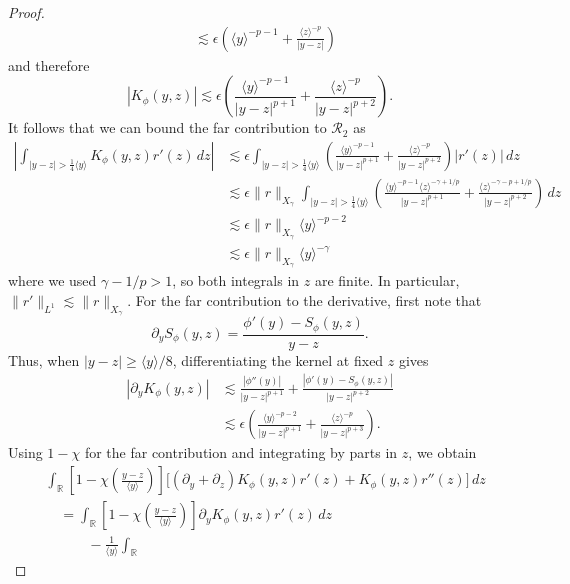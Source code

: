 \documentclass[11pt]{amsart}
\theoremstyle{definition}
\theoremstyle{remark}
\numberwithin{equation}{section}
\newcommand{\R}{\mathbb{R}}
\newcommand{\mc}[1]{\mathcal{#1}}
\newcommand{\ang}[1]{\langle #1 \rangle}
\begin{document}
\begin{proof}
\begin{align*}
    & \lesssim \epsilon\left(\ang{y}^{-p-1} + \frac{\ang{z}^{-p}}{|y - z|}\right)
\end{align*}
and therefore
\[|K_\phi(y, z)| \lesssim \epsilon\left(\frac{\ang{y}^{-p-1}}{|y - z|^{p+1}} + \frac{\ang{z}^{-p}}{|y - z|^{p+2}}\right).\]
It follows that we can bound the far contribution to $\mc{R}_2$ as
\begin{align*}
    \left|\int_{|y - z| > \frac{1}{4}\ang{y}} K_\phi(y, z) r'(z) \, dz\right| & \lesssim \epsilon\int_{|y - z| > \frac{1}{4}\ang{y}}\left(\frac{\ang{y}^{-p-1}}{|y - z|^{p+1}} + \frac{\ang{z}^{-p}}{|y - z|^{p+2}}\right)|r'(z)| \, dz\\
    & \lesssim \epsilon\|r\|_{X_\gamma}\int_{|y - z| > \frac{1}{4}\ang{y}}\left(\frac{\ang{y}^{-p-1}\ang{z}^{-\gamma+1/p}}{|y - z|^{p+1}} + \frac{\ang{z}^{-\gamma-p+1/p}}{|y - z|^{p+2}}\right) \, dz\\
    & \lesssim \epsilon\|r\|_{X_\gamma}\ang{y}^{-p-2} \\
    & \lesssim \epsilon\|r\|_{X_\gamma}\ang{y}^{-\gamma}
\end{align*}
where we used $\gamma-1/p>1$, so both integrals in $z$ are finite. In particular, $\|r'\|_{L^1}\lesssim\|r\|_{X_\gamma}$. For the far contribution to the derivative, first note that
\[
    \partial_yS_\phi(y,z)=\frac{\phi'(y)-S_\phi(y,z)}{y-z}.
\]
Thus, when $|y-z|\geq\ang{y}/8$, differentiating the kernel at fixed $z$ gives
\begin{equation}\label{eqn:linear_R2_far_kernel_derivative}
\begin{aligned}
    |\partial_yK_\phi(y,z)|
    &\lesssim\frac{|\phi''(y)|}{|y-z|^{p+1}}
    +\frac{|\phi'(y)-S_\phi(y,z)|}{|y-z|^{p+2}}\\
    &\lesssim\epsilon\left(
    \frac{\ang{y}^{-p-2}}{|y-z|^{p+1}}
    +\frac{\ang{z}^{-p}}{|y-z|^{p+3}}\right).
\end{aligned}
\end{equation}
Using $1-\chi$ for the far contribution and integrating by parts in $z$, we obtain
\begin{equation}\label{eqn:linear_R2_far_derivative_ibp}
\begin{aligned}
    &\int_{\R}\left[1-\chi\left(\frac{y-z}{\ang{y}}\right)\right]
    \bigl[(\partial_y+\partial_z)K_\phi(y,z)r'(z)+K_\phi(y,z)r''(z)\bigr]\,dz\\
    &\quad=\int_{\R}\left[1-\chi\left(\frac{y-z}{\ang{y}}\right)\right]
    \partial_yK_\phi(y,z)r'(z)\,dz\\
    &\qquad\quad-\frac{1}{\ang{y}}\int_{\R}

\end{aligned}
\end{equation}
\end{proof}
\end{document}
